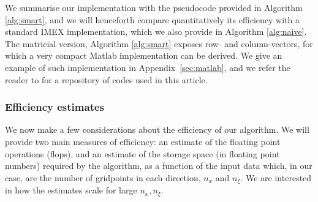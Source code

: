 \documentclass[a4paper,final]{siamart190516}
\begin{document}
We summarise our implementation with the pseudocode provided in Algorithm
\ref{alg:smart}, and we will henceforth compare quantitatively its efficiency with
a standard IMEX implementation, which we also provide in Algorithm \ref{alg:naive}. The
matricial version, Algorithm \ref{alg:smart} exposes row- and column-vectors, for
which a very compact Matlab implementation can be derived. We give an example of such
implementation in Appendix~\ref{sec:matlab}, and we refer the reader to
 for a repository of codes
used in this article.

\subsubsection{Efficiency estimates}

We now make a few considerations about the efficiency of our algorithm. We will provide
two main measures of efficiency: an estimate of the floating point operations (flops),
and an estimate of the storage space (in floating point numbers) required by the
algorithm, as a function of the input data which, in our case, are the number of
gridpoints in each direction, $n_x$ and $n_\xi$. We are  interested
in how the estimates scale for large $n_x, n_\xi$.
\end{document}
